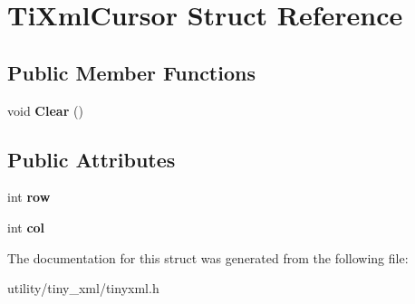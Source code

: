 \hypertarget{struct_ti_xml_cursor}{}\section{Ti\+Xml\+Cursor Struct Reference}
\label{struct_ti_xml_cursor}
\subsection*{Public Member Functions}
\begin{DoxyCompactItemize}
\item 
\mbox{\label{struct_ti_xml_cursor_a1e6fa622b59dafb71b6efe595105dcdd}} 
void {\bfseries Clear} ()
\end{DoxyCompactItemize}
\subsection*{Public Attributes}
\begin{DoxyCompactItemize}
\item 
\mbox{\label{struct_ti_xml_cursor_a5b54dd949820c2db061e2be41f3effb3}} 
int {\bfseries row}
\item 
\mbox{\label{struct_ti_xml_cursor_a5694d7ed2c4d20109d350c14c417969d}} 
int {\bfseries col}
\end{DoxyCompactItemize}


The documentation for this struct was generated from the following file\+:\begin{DoxyCompactItemize}
\item 
utility/tiny\+\_\+xml/tinyxml.\+h\end{DoxyCompactItemize}
